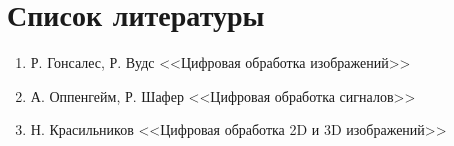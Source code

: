 \section{Список литературы}

\begin{enumerate}
    \item Р. Гонсалес, Р. Вудс <<Цифровая обработка изображений>>
    \item А. Оппенгейм, Р. Шафер <<Цифровая обработка сигналов>>
    \item Н. Красильников <<Цифровая обработка 2D и 3D изображений>>
\end{enumerate}
